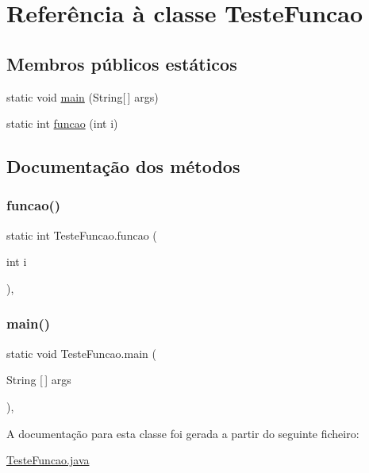 \hypertarget{class_teste_funcao}{}\section{Referência à classe Teste\+Funcao}
\label{class_teste_funcao}
\subsection*{Membros públicos estáticos}
\begin{DoxyCompactItemize}
\item 
static void \hyperlink{class_teste_funcao_ab069da84a5271232c879f47e3106608c}{main} (String\mbox{[}$\,$\mbox{]} args)
\item 
static int \hyperlink{class_teste_funcao_a5cb2b7ffe2d828a1f748befd28314d80}{funcao} (int i)
\end{DoxyCompactItemize}


\subsection{Documentação dos métodos}
\hypertarget{class_teste_funcao_a5cb2b7ffe2d828a1f748befd28314d80}{}\label{class_teste_funcao_a5cb2b7ffe2d828a1f748befd28314d80} 
\subsubsection{\texorpdfstring{funcao()}{funcao()}}
{\footnotesize\ttfamily static int Teste\+Funcao.\+funcao (\begin{DoxyParamCaption}\item[{int}]{i }\end{DoxyParamCaption})\hspace{0.3cm}{\ttfamily [inline]}, {\ttfamily [static]}}

\hypertarget{class_teste_funcao_ab069da84a5271232c879f47e3106608c}{}\label{class_teste_funcao_ab069da84a5271232c879f47e3106608c} 
\subsubsection{\texorpdfstring{main()}{main()}}
{\footnotesize\ttfamily static void Teste\+Funcao.\+main (\begin{DoxyParamCaption}\item[{String \mbox{[}$\,$\mbox{]}}]{args }\end{DoxyParamCaption})\hspace{0.3cm}{\ttfamily [inline]}, {\ttfamily [static]}}



A documentação para esta classe foi gerada a partir do seguinte ficheiro\+:\begin{DoxyCompactItemize}
\item 
\hyperlink{_teste_funcao_8java}{Teste\+Funcao.\+java}\end{DoxyCompactItemize}
